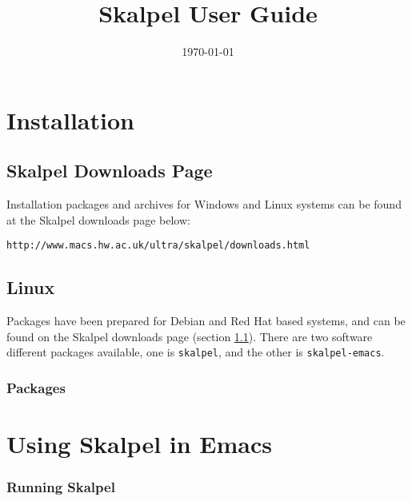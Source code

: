 \documentclass{report}
\title{Skalpel User Guide}
\date{\today}
\begin{document}
\maketitle
\vspace{110mm}

\newpage

\tableofcontents

\newpage

\chapter {Installation}

\section {Skalpel Downloads Page}
\label{skalpel-downloads-page}

Installation packages and archives for Windows and Linux systems can
be found at the Skalpel downloads page below:

\begin{center}\texttt{http://www.macs.hw.ac.uk/ultra/skalpel/downloads.html}\end{center}


\section {Linux}

Packages have been prepared for Debian and Red Hat based systems, and
can be found on the Skalpel downloads page (section
\ref{skalpel-downloads-page}). There are two software different
packages available, one is \texttt{skalpel}, and the other is
\texttt{skalpel-emacs}.

\subsection {Packages}


\chapter{Using Skalpel in Emacs}

\subsection{Running Skalpel}

\end{document}
